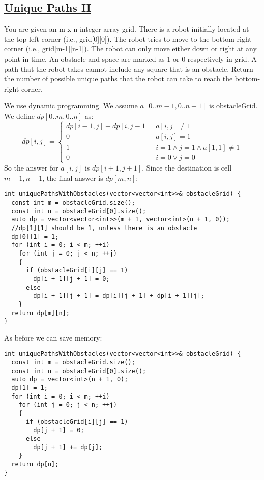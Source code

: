 \documentclass{book}
\begin{document}
	\subsection{\href{https://leetcode.com/problems/unique-paths-ii/}{Unique Paths II}}
	You are given an m x n integer array grid. There is a robot initially located at the top-left corner (i.e., grid[0][0]). The robot tries to move to the bottom-right corner (i.e., grid[m-1][n-1]). The robot can only move either down or right at any point in time. An obstacle and space are marked as 1 or 0 respectively in grid. A path that the robot takes cannot include any square that is an obstacle. Return the number of possible unique paths that the robot can take to reach the bottom-right corner.
	\par We use dynamic programming. We assume $a[0..m-1, 0..n-1]$ is obstacleGrid. We define $dp[0..m, 0..n]$ as:
	\begin{equation*}
		dp[i, j] = \begin{cases}
			dp[i - 1, j] + dp[i, j -1] & a[i, j] \ne 1 \\
			0 & a[i, j] = 1 \\
			1 & i = 1 \land j = 1 \land a[1, 1] \ne 1 \\
			0 & i = 0 \lor j = 0
		\end{cases}
	\end{equation*}
	So the answer for $a[i, j]$ is $dp[i + 1, j + 1]$. Since the destination is cell $m-1, n - 1$, the final answer is $dp[m, n]$:
	\begin{lstlisting}
int uniquePathsWithObstacles(vector<vector<int>>& obstacleGrid) {
  const int m = obstacleGrid.size();
  const int n = obstacleGrid[0].size();
  auto dp = vector<vector<int>>(m + 1, vector<int>(n + 1, 0));
  //dp[1][1] should be 1, unless there is an obstacle
  dp[0][1] = 1;
  for (int i = 0; i < m; ++i)
    for (int j = 0; j < n; ++j)
    {
      if (obstacleGrid[i][j] == 1)
        dp[i + 1][j + 1] = 0;
      else
        dp[i + 1][j + 1] = dp[i][j + 1] + dp[i + 1][j];
    }
  return dp[m][n];
}
	\end{lstlisting}
	As before we can save memory:
	\begin{lstlisting}
int uniquePathsWithObstacles(vector<vector<int>>& obstacleGrid) {
  const int m = obstacleGrid.size();
  const int n = obstacleGrid[0].size();
  auto dp = vector<int>(n + 1, 0);
  dp[1] = 1;
  for (int i = 0; i < m; ++i)
    for (int j = 0; j < n; ++j)
    {
      if (obstacleGrid[i][j] == 1)
        dp[j + 1] = 0;
      else
        dp[j + 1] += dp[j];
    }
  return dp[n];
}
	\end{lstlisting}
\end{document}
